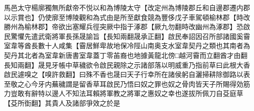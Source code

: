 馬邑太守楊廓獨無所獻帝不悦以和為博陵太守【改定州為博陵郡丘和自邊郡遷内郡以示賞也】仍使廓至博陵觀和為式由是所至獻食競為豐侈戊子車駕頓榆林郡【時改勝州為榆林郡】帝欲出塞耀兵徑突厥中指于涿郡【厥九勿翻時改幽州為涿郡】恐啟民驚懼先遣武衛將軍長孫晟諭旨【長知兩翻晟承正翻】啟民奉詔因召所部諸國奚霫室韋等酋長數十人咸集【霫居鮮卑故地保冷陘山南奥支水室韋契丹之類也其南者為契丹其北者為室韋新唐書室韋蓋丁零苖裔也地據黃龍北傍□越河霫而立翻酋才由翻長知兩翻】晟見牙帳中草穢欲令啟民親除之示諸部落以明威重乃指前草曰此根大香啟民遽嗅之【嗅許救翻】曰殊不香也晟曰天子行幸所在諸侯躬自灑掃耕除御路以表至敬之心今牙内蕪穢謂是留香草耳啟民乃悟曰奴之罪也奴之骨肉皆天子所賜得効筋力豈敢有辭特以邊人不知法耳賴將軍教之將軍之惠奴之幸也遂拔所佩刀自芟庭草【芟所衘翻】其貴人及諸部爭效之於是